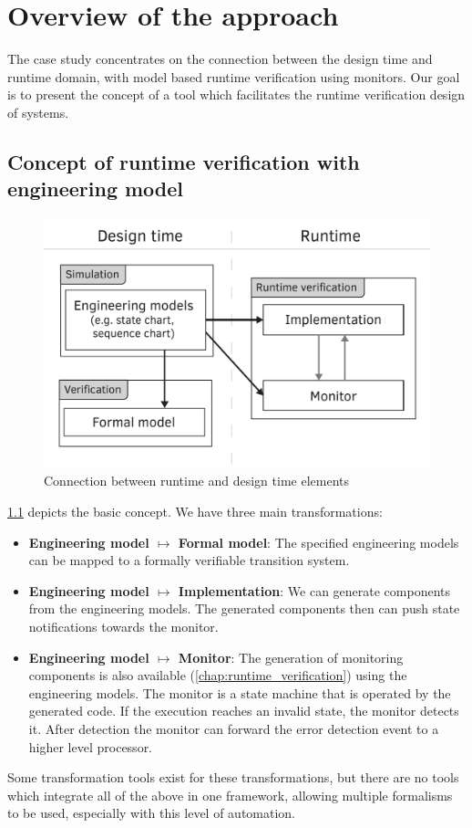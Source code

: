 \chapter{Overview of the approach}
\label{chap:overview}

The case study concentrates on the connection between the design time and runtime domain, with model based runtime verification using monitors. Our goal is to present the concept of a tool which facilitates the runtime verification design of systems.

\section{Concept of runtime verification with engineering model}

\begin{figure}[h]
	\centering
	\includegraphics[width=0.6\linewidth]{include/figures/chapter_3/abstract_overview}
	\caption{Connection between runtime and design time elements}
	\label{fig:overview:abstract_overview}
\end{figure}

\cref{fig:overview:abstract_overview} depicts the basic concept. We have three main transformations:
\begin{itemize}
	\item \textbf{Engineering model $\mapsto$ Formal model}: The specified engineering models can be mapped to a formally verifiable transition system.
	\item \textbf{Engineering model $\mapsto$ Implementation}: We can generate components from the engineering models. The generated components then can push state notifications towards the monitor.
	\item \textbf{Engineering model $\mapsto$ Monitor}: The generation of monitoring components is also available (\vref{chap:runtime_verification}) using the engineering models. The monitor is a state machine that is operated by the generated code. If the execution reaches an invalid state, the monitor detects it. After detection the monitor can forward the error detection event to a higher level processor.
\end{itemize}
Some transformation tools exist for these transformations, but there are no tools which integrate all of the above in one framework, allowing multiple formalisms to be used, especially with this level of automation.
\\[1ex]

